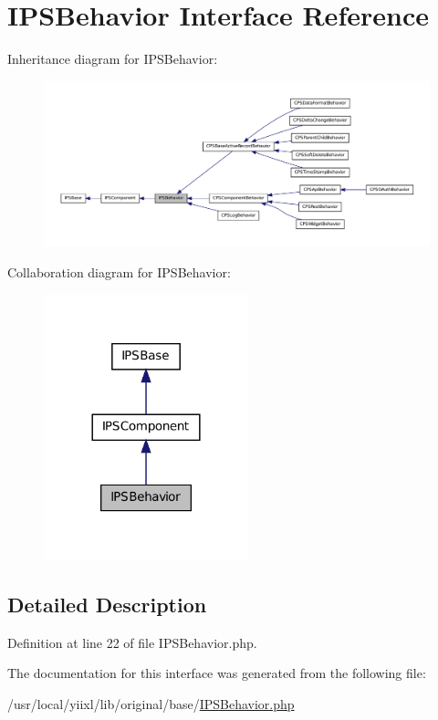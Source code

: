 \hypertarget{interfaceIPSBehavior}{
\section{IPSBehavior Interface Reference}
\label{interfaceIPSBehavior}
}


Inheritance diagram for IPSBehavior:\nopagebreak
\begin{figure}[H]
\begin{center}
\leavevmode
\includegraphics[width=400pt]{interfaceIPSBehavior__inherit__graph}
\end{center}
\end{figure}


Collaboration diagram for IPSBehavior:\nopagebreak
\begin{figure}[H]
\begin{center}
\leavevmode
\includegraphics[width=168pt]{interfaceIPSBehavior__coll__graph}
\end{center}
\end{figure}


\subsection{Detailed Description}


Definition at line 22 of file IPSBehavior.php.



The documentation for this interface was generated from the following file:\begin{DoxyCompactItemize}
\item 
/usr/local/yiixl/lib/original/base/\hyperlink{IPSBehavior_8php}{IPSBehavior.php}\end{DoxyCompactItemize}
